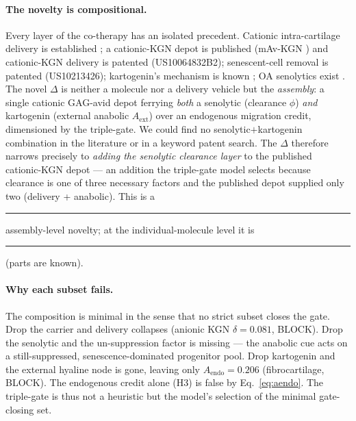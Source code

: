 \documentclass[11pt,a4paper]{article}
\newcommand{\tierdisc}[1]{\textcolor{#1}{\rule[0.05ex]{1.0ex}{1.0ex}}}
\newcommand{\tierGreen}{\tierdisc{green!60!black}} %
\newcommand{\tierOrange}{\tierdisc{orange!90!black}} %
\begin{document}
\paragraph{The novelty is compositional.}
Every layer of the co-therapy has an isolated precedent. Cationic intra-cartilage
delivery is established \citep{bajpayee2014,bajpayee2017}; a cationic-KGN depot is
published (mAv-KGN \citep{he2022}) and cationic-KGN delivery is patented
(US10064832B2); senescent-cell removal is patented (US10213426); kartogenin's
mechanism is known \citep{johnson2012}; OA senolytics exist \citep{jeon2017,zhu2015}.
The novel $\Delta$ is neither a molecule nor a delivery vehicle but the
\emph{assembly}: a single cationic GAG-avid depot ferrying \emph{both} a senolytic
(clearance $\phi$) \emph{and} kartogenin (external anabolic $A_{\mathrm{ext}}$) over
an endogenous migration credit, dimensioned by the triple-gate. We could find no
senolytic$+$kartogenin combination in the literature or in a keyword patent search.
The $\Delta$ therefore narrows precisely to \emph{adding the senolytic clearance
layer} to the published cationic-KGN depot --- an addition the triple-gate model
selects because clearance is one of three necessary factors and the published depot
supplied only two (delivery + anabolic). This is a \tierGreen{} assembly-level
novelty; at the individual-molecule level it is \tierOrange{} (parts are known).

\paragraph{Why each subset fails.}
The composition is minimal in the sense that no strict subset closes the gate.
Drop the carrier and delivery collapses (anionic KGN $\delta=0.081$, BLOCK). Drop
the senolytic and the un-suppression factor is missing --- the anabolic cue acts on
a still-suppressed, senescence-dominated progenitor pool. Drop kartogenin and the
external hyaline node is gone, leaving only $A_{\mathrm{endo}}=0.206$ (fibrocartilage,
BLOCK). The endogenous credit alone (H3) is false by Eq.~\eqref{eq:aendo}. The
triple-gate is thus not a heuristic but the model's selection of the minimal
gate-closing set.
\end{document}
